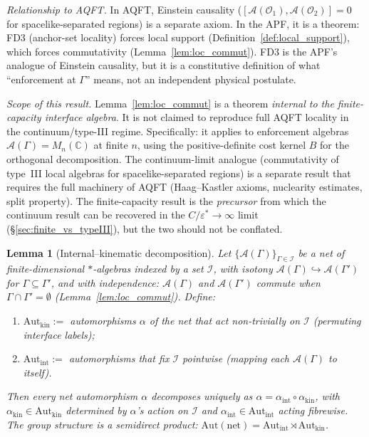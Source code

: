 \documentclass[11pt,a4paper]{article}
\newtheorem{lemma}[theorem]{Lemma}
\theoremstyle{definition}
\begin{document}
\noindent\textit{Relationship to AQFT.}\quad
In AQFT, Einstein causality ($[\mathcal{A}(\mathcal{O}_1),
\mathcal{A}(\mathcal{O}_2)] = 0$ for spacelike-separated regions) is
a separate axiom.  In the APF, it is a theorem: FD3 (anchor-set
locality) forces local support (Definition~\ref{def:local_support}),
which forces commutativity (Lemma~\ref{lem:loc_commut}).  FD3 is the
APF's analogue of Einstein causality, but it is a constitutive
definition of what ``enforcement at $\Gamma$'' means, not an
independent physical postulate.

\smallskip\noindent\textit{Scope of this result.}\quad
Lemma~\ref{lem:loc_commut} is a theorem \emph{internal to the
finite-capacity interface algebra}.  It is not claimed to reproduce
full AQFT locality in the continuum/type-III regime.  Specifically:
it applies to enforcement algebras $\mathcal{A}(\Gamma) =
M_n(\mathbb{C})$ at finite $n$, using the positive-definite cost
kernel $B$ for the orthogonal decomposition.  The continuum-limit
analogue (commutativity of type~III local algebras for
spacelike-separated regions) is a separate result that requires the
full machinery of AQFT (Haag--Kastler axioms, nuclearity estimates,
split property).  The finite-capacity result is the \emph{precursor}
from which the continuum result can be recovered in the
$C / \varepsilon^* \to \infty$ limit
(\S\ref{sec:finite_vs_typeIII}), but the two should not be
conflated.

\begin{lemma}[Internal--kinematic decomposition]\label{lem:aut_decomp}
Let $\{\mathcal{A}(\Gamma)\}_{\Gamma \in \mathcal{I}}$ be a net of
finite-dimensional $*$-algebras indexed by a set $\mathcal{I}$, with
isotony $\mathcal{A}(\Gamma) \hookrightarrow \mathcal{A}(\Gamma')$ for
$\Gamma \subseteq \Gamma'$, and with independence: $\mathcal{A}(\Gamma)$
and $\mathcal{A}(\Gamma')$ commute when $\Gamma \cap \Gamma' = \emptyset$
(Lemma~\ref{lem:loc_commut}).  Define:
\begin{enumerate}[label=(\alph*),nosep]
  \item $\mathrm{Aut}_{\mathrm{kin}} :=$ automorphisms $\alpha$ of the
  net that act non-trivially on $\mathcal{I}$ (permuting interface
  labels);
  \item $\mathrm{Aut}_{\mathrm{int}} :=$ automorphisms that fix
  $\mathcal{I}$ pointwise (mapping each $\mathcal{A}(\Gamma)$ to itself).
\end{enumerate}
Then every net automorphism $\alpha$ decomposes uniquely as
$\alpha = \alpha_{\mathrm{int}} \circ \alpha_{\mathrm{kin}}$, with
$\alpha_{\mathrm{kin}} \in \mathrm{Aut}_{\mathrm{kin}}$ determined by
$\alpha$'s action on $\mathcal{I}$ and
$\alpha_{\mathrm{int}} \in \mathrm{Aut}_{\mathrm{int}}$ acting fibrewise.
The group structure is a semidirect product:
$\mathrm{Aut}(\text{net}) = \mathrm{Aut}_{\mathrm{int}} \rtimes
\mathrm{Aut}_{\mathrm{kin}}$.
\end{lemma}
\end{document}
